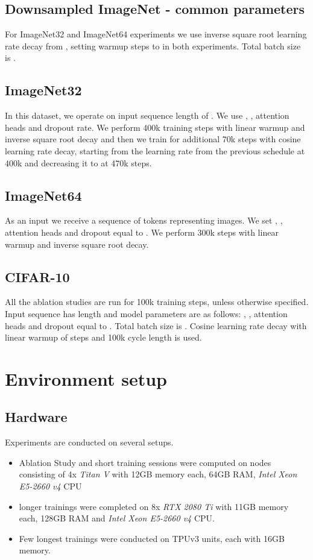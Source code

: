 \documentclass[11pt]{article}
\begin{document}
\subsection{Downsampled ImageNet - common parameters}
For ImageNet32 and ImageNet64 experiments we use inverse square root learning rate decay from \cite{vaswani2017attention}, setting warmup steps to  in both experiments. Total batch size is .

\subsection{ImageNet32}
In this dataset, we operate on input sequence length of . We use , ,  attention heads and  dropout rate. We perform 400k training steps with linear warmup and inverse square root decay and then we train for additional 70k steps with cosine learning rate decay, starting from the learning rate from the previous schedule at 400k and decreasing it to  at 470k steps. 

\subsection{ImageNet64}
As an input we receive a sequence of  tokens representing  images. We set , ,  attention heads and dropout equal to . We perform 300k steps with linear warmup and inverse square root decay.

\subsection{CIFAR-10}
All the ablation studies are run for 100k training steps, unless otherwise specified. Input sequence has length  and model parameters are as follows: , ,  attention heads and dropout equal to . Total batch size is . Cosine learning rate decay with linear warmup of  steps and 100k cycle length is used.



\section{Environment setup}
\subsection{Hardware}
Experiments are conducted on several setups. 
\begin{itemize}
    \item Ablation Study and short training sessions were computed on nodes consisting of 4x \emph{Titan V} with 12GB memory each, 64GB RAM, \emph{Intel Xeon E5-2660 v4} CPU
    \item longer trainings were completed on 8x \emph{RTX 2080 Ti} with 11GB memory each, 128GB RAM and \emph{Intel Xeon E5-2660 v4} CPU.
    \item Few longest trainings were conducted on  TPUv3 units, each with 16GB memory.
\end{itemize}
\end{document}
